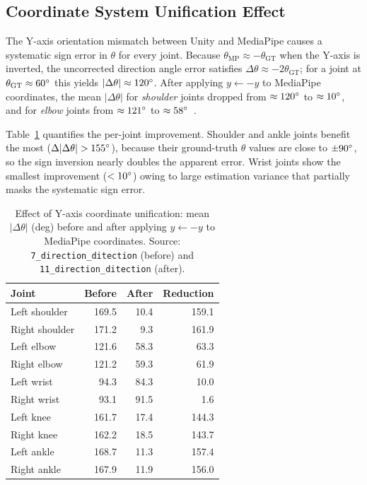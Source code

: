 \documentclass[twocolumn]{article}
\begin{document}
\subsection{Coordinate System Unification Effect}

The Y-axis orientation mismatch between Unity and MediaPipe causes a
systematic sign error in $\theta$ for every joint. Because
$\theta_{\text{MP}} \approx -\theta_{\text{GT}}$ when the Y-axis is
inverted, the uncorrected direction angle error satisfies
$\Delta\theta \approx -2\theta_{\text{GT}}$; for a joint at
$\theta_{\text{GT}} \approx 60\degree{}$ this yields $|\Delta\theta| \approx 120\degree{}$.
After applying $y \leftarrow -y$ to MediaPipe coordinates, the mean
$|\Delta\theta|$ for \emph{shoulder} joints dropped from $\approx120\degree{}$ to
$\approx10\degree{}$, and for \emph{elbow} joints from $\approx121\degree{}$ to
$\approx58\degree{}$~\cite{mediapipe_coord_issue}.

Table~\ref{tab:yflip_effect} quantifies the per-joint improvement.
Shoulder and ankle joints benefit the most ($\Delta|\Delta\theta|>155\degree{}$),
because their ground-truth $\theta$ values are close to $\pm90\degree{}$,
so the sign inversion nearly doubles the apparent error.
Wrist joints show the smallest improvement ($<10\degree{}$) owing to
large estimation variance that partially masks the systematic sign error.

\begin{table}[!t]
\centering
\caption{Effect of Y-axis coordinate unification: mean $|\Delta\theta|$ (deg)
  before and after applying $y \leftarrow -y$ to MediaPipe coordinates.
  Source: \texttt{7\_direction\_ditection} (before) and
  \texttt{11\_direction\_ditection} (after).}
\label{tab:yflip_effect}
\small
\begin{tabular}{lrrr}
\toprule
Joint          & Before & After & Reduction \\
\midrule
Left shoulder  & 169.5 & 10.4 & 159.1 \\
Right shoulder & 171.2 &  9.3 & 161.9 \\
Left elbow     & 121.6 & 58.3 &  63.3 \\
Right elbow    & 121.2 & 59.3 &  61.9 \\
Left wrist     &  94.3 & 84.3 &  10.0 \\
Right wrist    &  93.1 & 91.5 &   1.6 \\
Left knee      & 161.7 & 17.4 & 144.3 \\
Right knee     & 162.2 & 18.5 & 143.7 \\
Left ankle     & 168.7 & 11.3 & 157.4 \\
Right ankle    & 167.9 & 11.9 & 156.0 \\
\bottomrule
\end{tabular}
\end{table}
\end{document}
